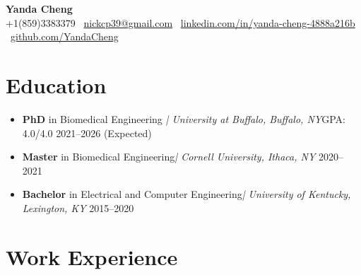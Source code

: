 \documentclass[letterpaper,10pt]{article}
\begin{document}
\begin{center}
\vspace{-5pt}
  {\Large \textbf{Yanda Cheng}} \\
  \vspace{-2pt}
  \small +1(859)3383379 \textbar\ \href{mailto:nickcp39@gmail.com}{nickcp39@gmail.com} \textbar\
\href{https://linkedin.com/in/yanda-cheng-4888a216b}{linkedin.com/in/yanda-cheng-4888a216b} \textbar\
\href{https://github.com/YandaCheng}{github.com/YandaCheng}
\vspace*{-5pt}
\end{center}
\vspace*{-10pt}
\vspace*{-5pt}






\section{Education}
\begin{itemize}[leftmargin=0.0in, label={}, itemsep=2pt, topsep=2pt]
  \item \textbf{PhD} in Biomedical Engineering \hfill\textit{| University at Buffalo, Buffalo, NY}\hfill GPA: 4.0/4.0 \hfill 2021--2026 (Expected)
  \vspace*{-3pt}
  \item \textbf{Master}  in Biomedical Engineering\hfill\textit{| Cornell University, Ithaca, NY} \hfill 2020--2021
  \vspace*{-3pt}
  \item \textbf{Bachelor}  in Electrical and Computer Engineering\hfill  \textit{| University of Kentucky, Lexington, KY} \hfill 2015--2020
\end{itemize}


\vspace*{-10pt}
\section{Work Experience}
\begin{itemize}[leftmargin=0in, label={}]










\end{itemize}
\vspace*{-10pt}
\vspace*{-2pt}
\end{document}
